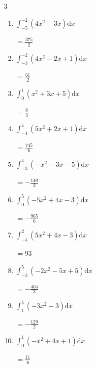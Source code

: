 \begin{multicols}{3}
\begin{enumerate}
        $\displaystyle =\frac{13}{2}$

  \item $\displaystyle \int_{-5}^{-2}\left( 4x^{2}-3x \right) \mathrm{d}x$

        $\displaystyle =\frac{375}{2}$

  \item $\displaystyle \int_{-3}^{-2}\left( 4x^{2}-2x+1 \right) \mathrm{d}x$

        $\displaystyle =\frac{61}{2}$

\columnbreak %

  \item $\displaystyle \int_{0}^{1}\left( x^{2}+3x+5 \right) \mathrm{d}x$

        $\displaystyle =\frac{8}{3}$

  \item $\displaystyle \int_{-1}^{4}\left( 5x^{2}+2x+1 \right) \mathrm{d}x$

        $\displaystyle =\frac{745}{6}$

  \item $\displaystyle \int_{-3}^{4}\left( -x^{2}-3x-5 \right) \mathrm{d}x$

        $\displaystyle =-\frac{140}{3}$

  \item $\displaystyle \int_{0}^{5}\left( -5x^{2}+4x-3 \right) \mathrm{d}x$

        $\displaystyle =-\frac{965}{6}$

  \item $\displaystyle \int_{-4}^{2}\left( 5x^{2}+4x-3 \right) \mathrm{d}x$

        $\displaystyle =93$

\columnbreak %

\resetques

  \item $\displaystyle \int_{-3}^{5}\left( -2x^{2}-5x+5 \right) \mathrm{d}x$

        $\displaystyle =-\frac{404}{3}$

  \item $\displaystyle \int_{1}^{4}\left( -3x^{2}-3 \right) \mathrm{d}x$

        $\displaystyle =-\frac{129}{2}$

  \item $\displaystyle \int_{0}^{1}\left( -x^{2}+4x+1 \right) \mathrm{d}x$

        $\displaystyle =\frac{11}{6}$


\end{enumerate}
\end{multicols}
